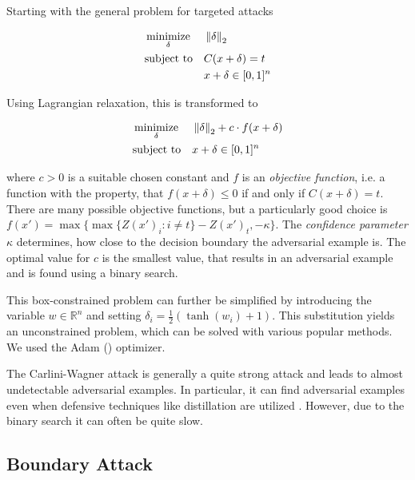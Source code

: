 Starting with the general problem for targeted attacks

\begin{equation}
\begin{aligned}
& \operatorname*{minimize}_{\delta} && \left \lVert \delta \right \rVert _2 \\
& \text{subject to} && C(x + \delta) = t \\
& && x + \delta \in [0,1]^n
\end{aligned}
\end{equation}

Using Lagrangian relaxation, this is transformed to

\begin{equation}
\begin{aligned}
& \operatorname*{minimize}_{\delta} && \left \lVert \delta \right \rVert _2 + c \cdot f(x + \delta)\\
& \text{subject to} && x + \delta \in [0,1]^n
\end{aligned}
\end{equation}

where $c > 0$ is a suitable chosen constant and $f$ is an \emph{objective function}, i.e. a function with the property, that
$f(x + \delta) \leq 0$ if and only if $C(x + \delta) = t$.
There are many possible objective functions, but a particularly good choice is
$f(x') = \max \{ \max \{Z(x')_i : i \neq t \} - Z(x')_t, -\kappa \}$.
The \emph{confidence parameter} $\kappa$ determines, how close to the decision boundary the adversarial example is.
The optimal value for $c$ is the smallest value, that results in an adversarial example and is found using a binary search.

This box-constrained problem can further be simplified by introducing the variable $w \in \mathbb{R}^n$ and setting $\delta_i = \frac{1}{2} (\tanh(w_i) + 1)$.
This substitution yields an unconstrained problem, which can be solved with various popular methods. We used the Adam (\cite{adam}) optimizer.

The Carlini-Wagner attack is generally a quite strong attack and leads to almost undetectable adversarial examples.
In particular, it can find adversarial examples even when defensive techniques like distillation are utilized \cite{carlini}.
However, due to the binary search it can often be quite slow.

\subsection{Boundary Attack}

